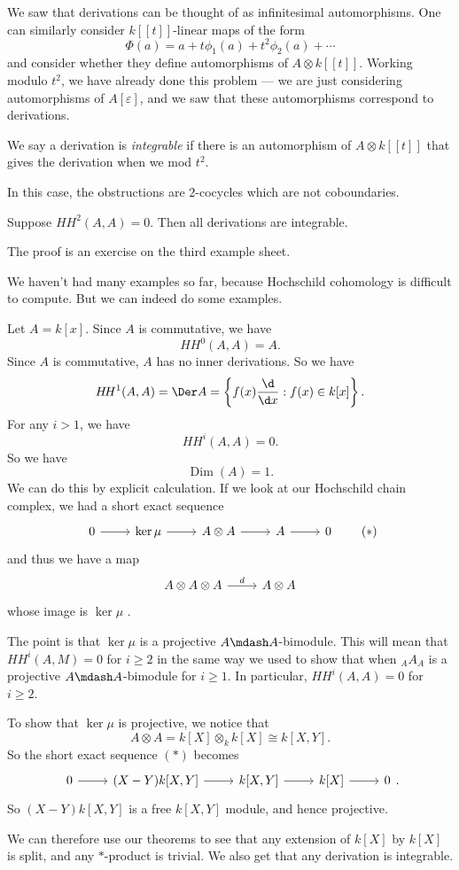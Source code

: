 \documentclass[a4paper]{article}
\DeclareMathOperator\Dim{Dim}
\newcommand\HH{H\!H}
\begin{document}
We saw that derivations can be thought of as infinitesimal automorphisms. One can similarly consider $k[[t]]$-linear maps of the form
\[
  \Phi(a) = a + t \phi_1(a) + t^2 \phi_2(a) + \cdots
\]
and consider whether they define automorphisms of $A \otimes k[[t]]$. Working modulo $t^2$, we have already done this problem --- we are just considering automorphisms of $A[\varepsilon]$, and we saw that these automorphisms correspond to derivations.

\begin{defi}
  We say a derivation is \emph{integrable} if there is an automorphism of $A \otimes k[[t]]$ that gives the derivation when we mod $t^2$.
\end{defi}
In this case, the obstructions are $2$-cocycles which are not coboundaries.

\begin{thm}[Gerstenhaber]
  Suppose $\HH^2(A, A) = 0$. Then all derivations are integrable.
\end{thm}
The proof is an exercise on the third example sheet.

We haven't had many examples so far, because Hochschild cohomology is difficult to compute. But we can indeed do some examples.
\begin{eg}
  Let $A = k[x]$. Since $A$ is commutative, we have
  \[
    \HH^0(A, A) = A.
  \]
  Since $A$ is commutative, $A$ has no inner derivations. So we have
  \[
    \HH^1(A, A) = \Der A = \left\{f(x) \frac{\d}{\d x}: f(x) \in k[x]\right\}.
  \]
  For any $i > 1$, we have
  \[
    \HH^i(A, A) = 0.
  \]
  So we have
  \[
    \Dim(A) = 1.
  \]
  We can do this by explicit calculation. If we look at our Hochschild chain complex, we had a short exact sequence
  \[
    \begin{tikzcd}
      0 \ar[r] & \ker \mu \ar[r] & A \otimes A \ar[r] & A \ar[r] & 0
    \end{tikzcd}\tag{$*$}
  \]
  and thus we have a map
  \[
    \begin{tikzcd}
      A \otimes A \otimes A \ar[r, "d"] & A \otimes A
    \end{tikzcd}
  \]
  whose image is $\ker \mu$ .

  The point is that $\ker \mu$ is a projective $A\mdash A$-bimodule. This will mean that $\HH^i(A, M) = 0$ for $i \geq 2$ in the same way we used to show that when $_AA_A$ is a projective $A\mdash A$-bimodule for $i \geq 1$. In particular, $\HH^i(A, A) = 0$ for $i \geq 2$.

  To show that $\ker \mu$ is projective, we notice that
  \[
    A \otimes A = k[X] \otimes_k k[X] \cong k[X, Y].
  \]
  So the short exact sequence $(*)$ becomes
  \[
    \begin{tikzcd}
      0 \ar[r] & (X - Y)k[X, Y] \ar[r] & k[X, Y] \ar[r] & k[X] \ar[r] & 0
    \end{tikzcd}.
  \]
  So $(X - Y)k[X, Y]$ is a free $k[X, Y]$ module, and hence projective.

  We can therefore use our theorems to see that any extension of $k[X]$ by $k[X]$ is split, and any $*$-product is trivial. We also get that any derivation is integrable.
\end{eg}
\end{document}
